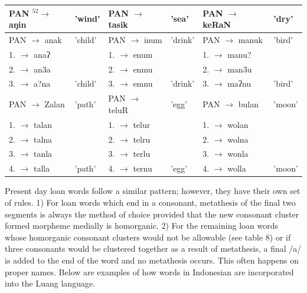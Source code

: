 \documentclass[10pt]{article}
\begin{document}
\begin{center}
\begin{tabular}{|l|l|l|l|l|l|}
\hline
PAN \({ }^{52} \rightarrow\) aŋin & 'wind' & PAN \(\rightarrow\) tasik & 'sea' & PAN \(\rightarrow\) keRaN & 'dry' \\
\hline
PAN \(\rightarrow\) anak & 'child' & PAN \(\rightarrow\) inum & 'drink' & PAN \(\rightarrow\) manuk & 'bird' \\
\hline
1. \(\rightarrow\) anaʔ &  & 1. \(\rightarrow\) enum &  & 1. \(\rightarrow\) manu? &  \\
\hline
2. \(\rightarrow\) an3a &  & 2. \(\rightarrow\) enmu &  & 2. \(\rightarrow\) man3u &  \\
\hline
3. \(\rightarrow\) a?na & 'child' & 3. \(\rightarrow\) emnu & 'drink' & 3. \(\rightarrow\) maʔnu & 'bird' \\
\hline
PAN \(\rightarrow\) Zalan & 'path' & PAN \(\rightarrow\) teluR & 'egg' & PAN \(\rightarrow\) bulan & 'moon' \\
\hline
1. \(\rightarrow\) talan &  & 1. \(\rightarrow\) telur &  & 1. \(\rightarrow\) wolan &  \\
\hline
2. \(\rightarrow\) talna &  & 2. \(\rightarrow\) telru &  & 2. \(\rightarrow\) wolna &  \\
\hline
3. \(\rightarrow\) tanla &  & 3. \(\rightarrow\) terlu &  & 3. \(\rightarrow\) wonla &  \\
\hline
4. \(\rightarrow\) talla & 'path' & 4. \(\rightarrow\) ternu & 'egg' & 4. \(\rightarrow\) wolla & 'moon' \\
\hline
\end{tabular}
\end{center}

Present day loan words follow a similar pattern; however, they have their own set of rules. 1) For loan words which end in a consonant, metathesis of the final two segments is always the method of choice provided that the new consonant cluster formed morpheme medially is homorganic. 2) For the remaining loan words whose homorganic consonant clusters would not be allowable (see table 8) or if three consonants would be clustered together as a result of metathesis, a final /a/ is added to the end of the word and no metathesis occurs. This often happens on proper names. Below are examples of how words in Indonesian are incorporated into the Luang language.
\end{document}
